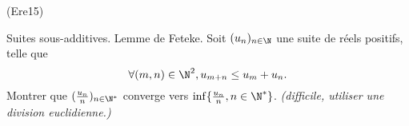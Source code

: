 \begin{tiny}(Ere15)\end{tiny} Suites sous-additives. Lemme de Feteke.\newline
{}  Soit $(u_{n})_{n\in \N}$ une suite de réels positifs, telle que
\[
\forall (m,n)\in \N^{2},u_{m+n}\leq u_{m}+u_{n}.
\]
Montrer que $(\frac{u_{n}}{n})_{n\in \N^*}$ converge vers $\inf \{\frac{u_{n}}{n},n\in \N^{*}\}$.\newline
\emph{(difficile, utiliser une division euclidienne.)} 
